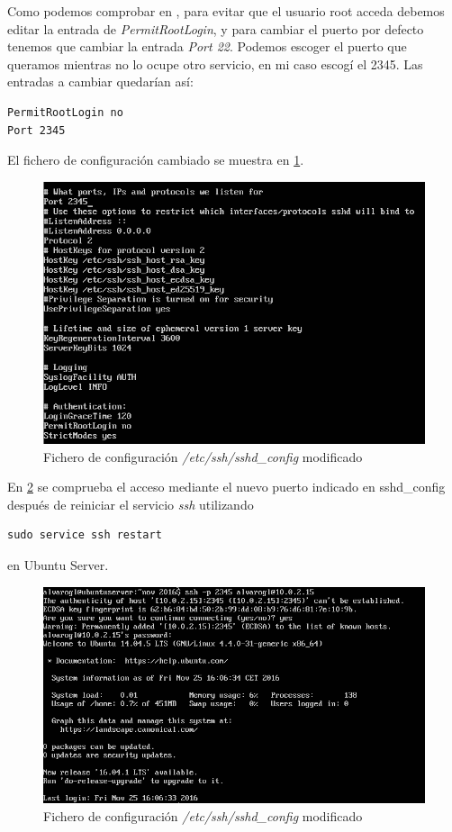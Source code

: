 Como podemos comprobar en \cite{ssh-config}, para evitar que el usuario root acceda debemos editar la entrada de \textit{PermitRootLogin}, y para cambiar el puerto por defecto tenemos que cambiar la entrada \textit{Port 22}. Podemos escoger el puerto que queramos mientras no lo ocupe otro servicio, en mi caso escogí el 2345. Las entradas a cambiar quedarían así:

\begin{verbatim}
PermitRootLogin no
Port 2345
\end{verbatim}

El fichero de configuración cambiado se muestra en \ref{ise11}.

\begin{figure}[H]
	\centering
	\includegraphics[scale=0.6]{ise11.png}
	\caption{Fichero de configuración \textit{/etc/ssh/sshd\_config} modificado} \label{ise11}
\end{figure}

En \ref{ise12} se comprueba el acceso mediante el nuevo puerto indicado en sshd\_config después de reiniciar el servicio \textit{ssh} utilizando \begin{verbatim}
sudo service ssh restart
\end{verbatim} en Ubuntu Server.

\begin{figure}[H]
	\centering
	\includegraphics[scale=0.6]{ise12.png}
	\caption{Fichero de configuración \textit{/etc/ssh/sshd\_config} modificado} \label{ise12}
\end{figure}

